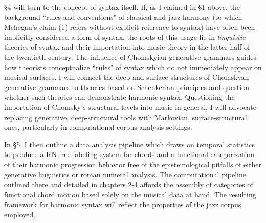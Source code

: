\S 4 will turn to the concept of syntax itself.  If, as I claimed in \S 1 above, the background ``rules and conventions" of classical and jazz harmony (to which Mehegan's claim (1) refers without explicit reference to syntax) have often been implicitly considered a form of syntax, the roots of this usage lie in \emph{linguistic} theories of syntax and their importation into music theory in the latter half of the twentieth century. The influence of Chomskyian generative grammars guides how theorists conceptualize ``rules" of syntax which do not immediately appear on musical surfaces.  I will connect the deep and surface structures of Chomskyan generative grammars to theories based on Schenkerian principles and question whether such theories can demonstrate harmonic syntax.  Questioning the importation of Chomsky's structural levels into music in general, I will advocate replacing generative, deep-structural tools with Markovian, surface-structural ones, particularly in computational corpus-analysis settings.

In \S 5, I then outline a data analysis pipeline which draws on temporal statistics to produce a RN-free labeling system for chords and a functional categorization of their harmonic progression behavior free of the epistemological pitfalls of either generative linguistics or roman numeral analysis.  The computational pipeline outlined there and detailed in chapters 2-4 affords the assembly of categories of functional chord motion based solely on the musical data at hand.  The resulting framework for harmonic syntax will reflect the properties of the jazz corpus employed.

